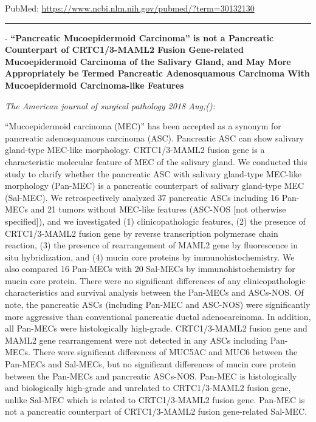 \documentclass[]{article}
\begin{document}
PubMed: \url{https://www.ncbi.nlm.nih.gov/pubmed/?term=30132130}

{}

{}

\begin{center}\rule{0.5\linewidth}{\linethickness}\end{center}

 - \textbf{``Pancreatic Mucoepidermoid Carcinoma'' is not a Pancreatic
Counterpart of CRTC1/3-MAML2 Fusion Gene-related Mucoepidermoid
Carcinoma of the Salivary Gland, and May More Appropriately be Termed
Pancreatic Adenosquamous Carcinoma With Mucoepidermoid Carcinoma-like
Features}

\emph{The American journal of surgical pathology 2018 Aug;():}

``Mucoepidermoid carcinoma (MEC)'' has been accepted as a synonym for
pancreatic adenosquamous carcinoma (ASC). Pancreatic ASC can show
salivary gland-type MEC-like morphology. CRTC1/3-MAML2 fusion gene is a
characteristic molecular feature of MEC of the salivary gland. We
conducted this study to clarify whether the pancreatic ASC with salivary
gland-type MEC-like morphology (Pan-MEC) is a pancreatic counterpart of
salivary gland-type MEC (Sal-MEC). We retrospectively analyzed 37
pancreatic ASCs including 16 Pan-MECs and 21 tumors without MEC-like
features (ASC-NOS {[}not otherwise specified{]}), and we investigated
(1) clinicopathologic features, (2) the presence of CRTC1/3-MAML2 fusion
gene by reverse transcription polymerase chain reaction, (3) the
presence of rearrangement of MAML2 gene by fluorescence in situ
hybridization, and (4) mucin core proteins by immunohistochemistry. We
also compared 16 Pan-MECs with 20 Sal-MECs by immunohistochemistry for
mucin core protein. There were no significant differences of any
clinicopathologic characteristics and survival analysis between the
Pan-MECs and ASCs-NOS. Of note, the pancreatic ASCs (including Pan-MEC
and ASC-NOS) were significantly more aggressive than conventional
pancreatic ductal adenocarcinoma. In addition, all Pan-MECs were
histologically high-grade. CRTC1/3-MAML2 fusion gene and MAML2 gene
rearrangement were not detected in any ASCs including Pan-MECs. There
were significant differences of MUC5AC and MUC6 between the Pan-MECs and
Sal-MECs, but no significant differences of mucin core protein between
the Pan-MECs and pancreatic ASCs-NOS. Pan-MEC is histologically and
biologically high-grade and unrelated to CRTC1/3-MAML2 fusion gene,
unlike Sal-MEC which is related to CRTC1/3-MAML2 fusion gene. Pan-MEC is
not a pancreatic counterpart of CRTC1/3-MAML2 fusion gene-related
Sal-MEC.
\end{document}
